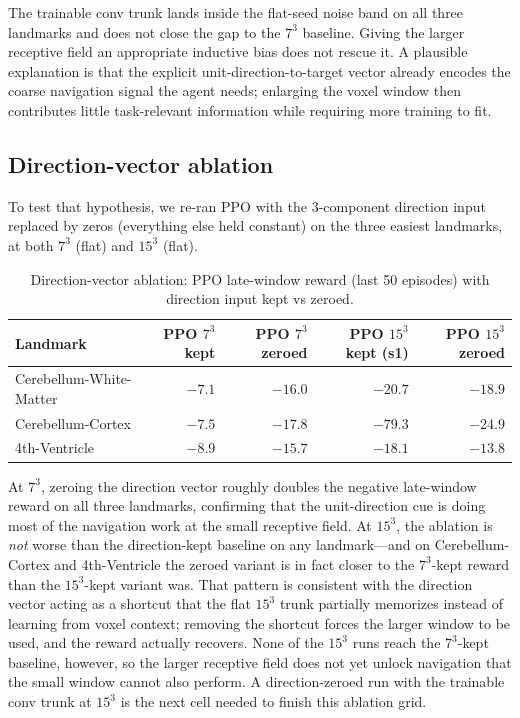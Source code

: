 \documentclass[11pt]{article}
\begin{document}
The trainable conv trunk lands inside the flat-seed noise band on all three landmarks and does not close the gap to the $7^3$ baseline. Giving the larger receptive field an appropriate inductive bias does not rescue it. A plausible explanation is that the explicit unit-direction-to-target vector already encodes the coarse navigation signal the agent needs; enlarging the voxel window then contributes little task-relevant information while requiring more training to fit.

\subsection*{Direction-vector ablation}

To test that hypothesis, we re-ran PPO with the 3-component direction input replaced by zeros (everything else held constant) on the three easiest landmarks, at both $7^3$ (flat) and $15^3$ (flat).

\begin{table}[H]
\centering
\footnotesize
\caption{Direction-vector ablation: PPO late-window reward (last 50 episodes) with direction input kept vs zeroed.}
\label{tab:nodir}
\begin{tabular}{lrrrr}
\toprule
Landmark & PPO $7^3$ kept & PPO $7^3$ zeroed & PPO $15^3$ kept (s1) & PPO $15^3$ zeroed \\
\midrule
Cerebellum-White-Matter & $-7.1$  & $-16.0$ & $-20.7$ & $-18.9$ \\
Cerebellum-Cortex       & $-7.5$  & $-17.8$ & $-79.3$ & $-24.9$ \\
4th-Ventricle           & $-8.9$  & $-15.7$ & $-18.1$ & $-13.8$ \\
\bottomrule
\end{tabular}
\end{table}

At $7^3$, zeroing the direction vector roughly doubles the negative late-window reward on all three landmarks, confirming that the unit-direction cue is doing most of the navigation work at the small receptive field. At $15^3$, the ablation is \emph{not} worse than the direction-kept baseline on any landmark---and on Cerebellum-Cortex and 4th-Ventricle the zeroed variant is in fact closer to the $7^3$-kept reward than the $15^3$-kept variant was. That pattern is consistent with the direction vector acting as a shortcut that the flat $15^3$ trunk partially memorizes instead of learning from voxel context; removing the shortcut forces the larger window to be used, and the reward actually recovers. None of the $15^3$ runs reach the $7^3$-kept baseline, however, so the larger receptive field does not yet unlock navigation that the small window cannot also perform. A direction-zeroed run with the trainable conv trunk at $15^3$ is the next cell needed to finish this ablation grid.
\end{document}
